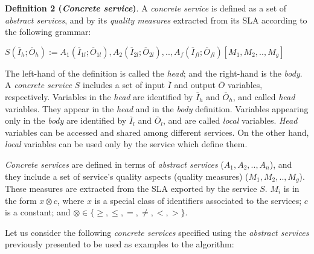 \noindent \textbf{Definition 2 (\textit{Concrete service})}. A \textit{concrete service} is defined as a set of \textit{abstract services}, and by its \textit{quality measures} extracted from its SLA according to the following grammar:
%
\begin{center}
\begin{math}
S (\overline{I}_{h}; \overline{O}_{h}) := A_{1}(\overline{I}_{1l}; \overline{O}_{1l}), A_{2}(\overline{I}_{2l}; \overline{O}_{2l}), ..,  A_{f}(\overline{I}_{fl}; \overline{O}_{fl})[M_{1},M_{2}, ..,M_{g}]
\end{math}
\end{center}
%
The left-hand of the definition is called the \textit{head}; and the right-hand is the \textit{body}. 
A \textit{concrete service} $S$ includes a set of input $\overline{I}$ and output $\overline{O}$ variables, respectively.
Variables in the \textit{head} are identified by $\overline{I}_{h}$ and $\overline{O}_{h}$, and called \textit{head} variables. 
They appear in the \textit{head} and in the \textit{body} definition. 
Variables appearing only in the \textit{body} are identified by $\overline{I}_{l}$ and $\overline{O}_{l}$, and are called \textit{local} variables. \textit{Head} variables can be accessed and shared among different services. On the other hand, \textit{local} variables can be used only by the service which define them.

\textit{Concrete services} are defined in terms of \textit{abstract services} ($A_{1}, A_{2}, .., A_{n}$), and they include a set of service's quality aspects (quality measures) ($M_{1},M_{2}, .., M_{g}$). 
These measures are extracted from the SLA exported by the service $S$.
%
%
$M_{i}$ is in the form $x \otimes c$, where $x$ is a special class of identifiers associated to the services; $c$ is a constant; and $\otimes \in\lbrace \geq, \leq, =, \neq, <, >\rbrace$. 

Let us consider the following \textit{concrete services} specified using the \textit{abstract services} previously presented to be used as examples to the algorithm:%

